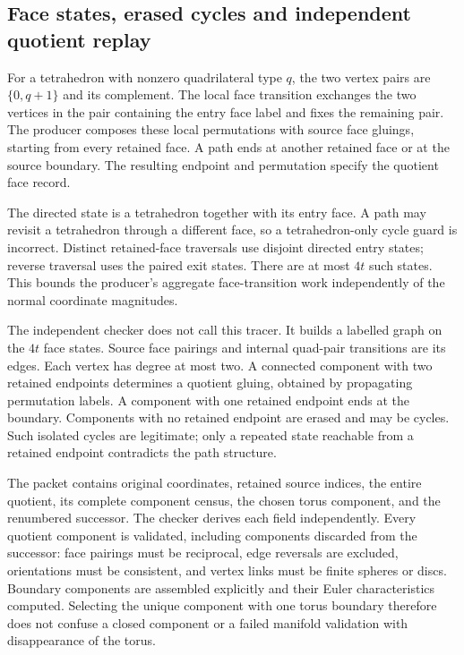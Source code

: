 \subsection{Face states, erased cycles and independent quotient replay}

For a tetrahedron with nonzero quadrilateral type $q$, the two vertex pairs
are $\{0,q+1\}$ and its complement.  The local face transition exchanges
the two vertices in the pair containing the entry face label and fixes
the remaining pair.  The producer composes these local permutations with
source face gluings, starting from every retained face.  A path ends at
another retained face or at the source boundary.  The resulting endpoint
and permutation specify the quotient face record.

The directed state is a tetrahedron together with its entry face.  A path
may revisit a tetrahedron through a different face, so a tetrahedron-only
cycle guard is incorrect.  Distinct retained-face traversals use disjoint
directed entry states; reverse traversal uses the paired exit states.
There are at most $4t$ such states.  This bounds the producer's aggregate
face-transition work independently of the normal coordinate magnitudes.

The independent checker does not call this tracer.  It builds a labelled
graph on the $4t$ face states.  Source face pairings and internal quad-pair
transitions are its edges.  Each vertex has degree at most two.  A connected
component with two retained endpoints determines a quotient gluing, obtained
by propagating permutation labels.  A component with one retained endpoint
ends at the boundary.  Components with no retained endpoint are erased and
may be cycles.  Such isolated cycles are legitimate; only a repeated state
reachable from a retained endpoint contradicts the path structure.

The packet contains original coordinates, retained source indices, the
entire quotient, its complete component census, the chosen torus component,
and the renumbered successor.  The checker derives each field independently.
Every quotient component is validated, including components discarded from
the successor: face pairings must be reciprocal, edge reversals are excluded,
orientations must be consistent, and vertex links must be finite spheres or
discs.  Boundary components are assembled explicitly and their Euler
characteristics computed.  Selecting the unique component with one torus
boundary therefore does not confuse a closed component or a failed manifold
validation with disappearance of the torus.

